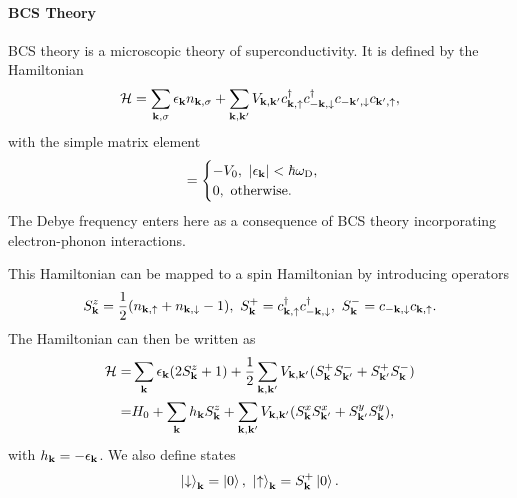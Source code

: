 \paragraph{BCS Theory}
BCS theory is a microscopic theory of superconductivity. It is defined by the Hamiltonian
\begin{align*}
	\mathcal{H} = \sum\limits_{\vb{k}, \sigma}\epsilon_{\vb{k}}n_{\vb{k}, \sigma} + \sum\limits_{\vb{k}, \vb{k}^{\prime}}V_{\vb{k}, \vb{k}^{\prime}}c_{\vb{k}, \uparrow}^{\dagger} c_{-\vb{k}, \downarrow}^{\dagger} c_{-\vb{k}^{\prime}, \downarrow}c_{\vb{k}^{\prime}, \uparrow},
\end{align*}
with the simple matrix element
\begin{align*}
	 = \begin{cases}
		 -V_{0},\ \abs{\epsilon_{\vb{k}}} < \hbar\omega_{\text{D}}, \\
		 0,\ \text{otherwise.}
	 \end{cases}
\end{align*}
The Debye frequency enters here as a consequence of BCS theory incorporating electron-phonon interactions.

This Hamiltonian can be mapped to a spin Hamiltonian by introducing operators
\begin{align*}
	S_{\vb{k}}^{z} = \frac{1}{2}(n_{\vb{k}, \uparrow} + n_{\vb{k}, \downarrow} - 1),\ S_{\vb{k}}^{+} = c_{\vb{k}, \uparrow}^{\dagger} c_{-\vb{k}, \downarrow}^{\dagger},\ S_{\vb{k}}^{-} = c_{-\vb{k}, \downarrow}c_{\vb{k}, \uparrow}.
\end{align*}
The Hamiltonian can then be written as
\begin{align*}
	\mathcal{H} =& \sum\limits_{\vb{k}}\epsilon_{\vb{k}}(2S_{\vb{k}}^{z} + 1) + \frac{1}{2}\sum\limits_{\vb{k}, \vb{k}^{\prime}}V_{\vb{k}, \vb{k}^{\prime}}(S_{\vb{k}}^{+}S_{\vb{k}^{\prime}}^{-} + S_{\vb{k}^{\prime}}^{+}S_{\vb{k}}^{-}) \\
	     =& H_{0} + \sum\limits_{\vb{k}}h_{\vb{k}}S_{\vb{k}}^{z} + \sum\limits_{\vb{k}, \vb{k}^{\prime}}V_{\vb{k}, \vb{k}^{\prime}}(S_{\vb{k}}^{x}S_{\vb{k}^{\prime}}^{x} + S_{\vb{k}^{\prime}}^{y}S_{\vb{k}}^{y}),
\end{align*}
with $h_{\vb{k}} = -\epsilon_{\vb{k}}$. We also define states
\begin{align*}
	\ket{\downarrow}_{\vb{k}} = \ket{0},\ \ket{\uparrow}_{\vb{k}} = S_{\vb{k}}^{+}\ket{0}.
\end{align*}

